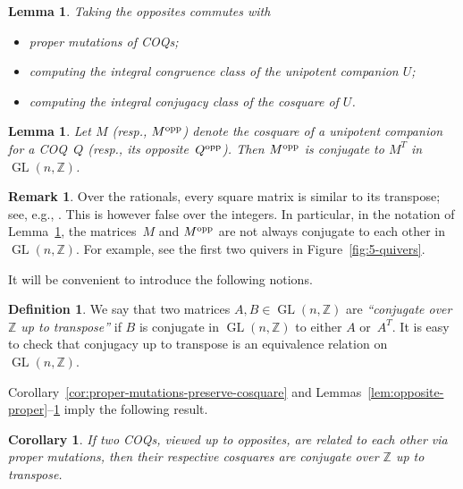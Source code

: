 \documentclass[11pt, letterpaper]{amsart}
\newtheorem{corollary}[theorem]{Corollary}
\newtheorem{lemma}[theorem]{Lemma}
\theoremstyle{definition}
\newtheorem{remark}[theorem]{Remark}
\newtheorem{definition}[theorem]{Definition}
\numberwithin{equation}{section}
\def\ZZ{{\mathbb Z}}
\def\GL{{\operatorname{GL}}}
\begin{document}
\begin{lemma}
Taking the opposites commutes with
\begin{itemize}[leftmargin=.2in]
\item proper mutations of COQs;
\item computing the integral congruence class of the unipotent companion $U$;
\item computing the integral conjugacy class of the cosquare of $U$.
\end{itemize}
\end{lemma}

\begin{lemma}
\label{lem:M-opp-vs-M}
Let $M$ (resp., $M^{\textup{opp}}$) denote the cosquare of a unipotent companion for a COQ~$Q$ 
(resp., its opposite~$Q^{\textup{opp}}$). 
Then $M^{\textup{opp}}$ is conjugate to $M^T$ in~$\GL(n,\ZZ)$.
\end{lemma}

\begin{remark}
\label{rem:rational transpose}
Over the rationals, every square matrix is similar to its transpose; see, e.g., \cite[Theorem~66]{Kaplansky69}. 
This is however false over the integers.
In particular, %
in the notation of Lemma~\ref{lem:M-opp-vs-M}, the matrices~$M$ and $M^{\textup{opp}}$ are not always 
conjugate to each other in $\GL(n,\ZZ)$.
For example, see the first two quivers in Figure~\ref{fig:5-quivers}. 
\end{remark}

It will be convenient to introduce the following notions.

\begin{definition}
\label{def:sim transpose}
We say that two matrices $A, B\in \GL(n,\ZZ)$ are \emph{``conjugate over $\ZZ$ up to transpose''} 
if $B$ is conjugate in $\GL(n,\ZZ)$ to either $A$ or~$A^T$.
It is easy to check that conjugacy up to transpose 
is an equivalence relation on $\GL(n,\ZZ)$.
\end{definition}

Corollary~\ref{cor:proper-mutations-preserve-cosquare} and 
Lemmas~\ref{lem:opposite-proper}--\ref{lem:M-opp-vs-M}
imply the following result. 

\begin{corollary}
\label{cor:sim trans vs opposites}
If two COQs, viewed up to opposites, are related to each other via proper mutations, 
then their respective cosquares are conjugate over $\ZZ$ up to transpose.  
\end{corollary}
\end{document}
